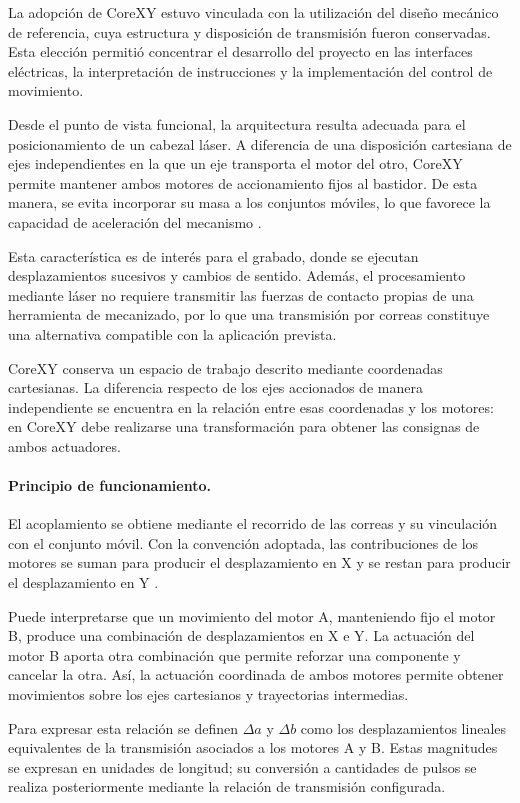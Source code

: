 \documentclass[blue,fullpaper]{ludusofficial}  %
\begin{document}
La adopción de CoreXY estuvo vinculada
con la utilización del diseño mecánico
de referencia, cuya estructura y disposición
de transmisión fueron conservadas.
Esta elección permitió concentrar el desarrollo
del proyecto en las interfaces eléctricas,
la interpretación de instrucciones y
la implementación del control de movimiento.

Desde el punto de vista funcional,
la arquitectura resulta adecuada para
el posicionamiento de un cabezal láser.
A diferencia de una disposición cartesiana
de ejes independientes en la que un eje
transporta el motor del otro, CoreXY permite
mantener ambos motores de accionamiento
fijos al bastidor. De esta manera,
se evita incorporar su masa a los conjuntos
móviles, lo que favorece la capacidad
de aceleración del mecanismo
\cite{corexy_fundamentos}.

Esta característica es de interés para
el grabado, donde se ejecutan desplazamientos
sucesivos y cambios de sentido.
Además, el procesamiento mediante láser
no requiere transmitir las fuerzas
de contacto propias de una herramienta
de mecanizado, por lo que una transmisión
por correas constituye una alternativa
compatible con la aplicación prevista.

CoreXY conserva un espacio de trabajo
descrito mediante coordenadas cartesianas.
La diferencia respecto de los ejes
accionados de manera independiente
se encuentra en la relación entre
esas coordenadas y los motores:
en CoreXY debe realizarse una transformación
para obtener las consignas de ambos
actuadores.

\paragraph{Principio de funcionamiento.}

El acoplamiento se obtiene mediante
el recorrido de las correas y su vinculación
con el conjunto móvil. Con la convención
adoptada, las contribuciones de los motores
se suman para producir el desplazamiento
en X y se restan para producir
el desplazamiento en Y
\cite{corexy_teoria}.

Puede interpretarse que un movimiento
del motor A, manteniendo fijo el motor B,
produce una combinación de desplazamientos
en X e Y. La actuación del motor B aporta
otra combinación que permite reforzar
una componente y cancelar la otra.
Así, la actuación coordinada de ambos
motores permite obtener movimientos
sobre los ejes cartesianos y trayectorias
intermedias.

Para expresar esta relación se definen
$\Delta a$ y $\Delta b$ como los
desplazamientos lineales equivalentes
de la transmisión asociados a los
motores A y B. Estas magnitudes se
expresan en unidades de longitud;
su conversión a cantidades de pulsos
se realiza posteriormente mediante
la relación de transmisión configurada.
\end{document}
